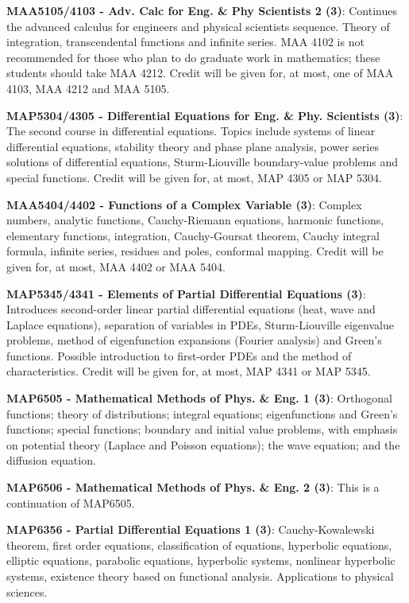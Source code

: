 \documentclass[11pt]{article}
\begin{document}
\textbf{MAA5105/4103 - Adv. Calc for Eng. \& Phy Scientists 2 (3)}: Continues the advanced calculus for engineers and physical scientists sequence. Theory of integration, transcendental functions and infinite series. MAA 4102 is not recommended for those who plan to do graduate work in mathematics; these students should take MAA 4212. Credit will be given for, at most, one of MAA 4103, MAA 4212 and MAA 5105.

\textbf{MAP5304/4305 - Differential Equations for Eng. \& Phy. Scientists (3)}: The second course in differential equations. Topics include systems of linear differential equations, stability theory and phase plane analysis, power series solutions of differential equations, Sturm-Liouville boundary-value problems and special functions. Credit will be given for, at most, MAP 4305 or MAP 5304.

\textbf{MAA5404/4402 - Functions of a Complex Variable (3)}: Complex numbers, analytic functions, Cauchy-Riemann equations, harmonic functions, elementary functions, integration, Cauchy-Goursat theorem, Cauchy integral formula, infinite series, residues and poles, conformal mapping. Credit will be given for, at most, MAA 4402 or MAA 5404.

\textbf{MAP5345/4341 - Elements of Partial Differential Equations (3)}: Introduces second-order linear partial differential equations (heat, wave and Laplace equations), separation of variables in PDEs, Sturm-Liouville eigenvalue problems, method of eigenfunction expansions (Fourier analysis) and Green's functions. Possible introduction to first-order PDEs and the method of characteristics. Credit will be given for, at most, MAP 4341 or MAP 5345.

\textbf{MAP6505 - Mathematical Methods of Phys. \& Eng. 1 (3)}: Orthogonal functions; theory of distributions; integral equations; eigenfunctions and Green's functions; special functions; boundary and initial value problems, with emphasis on potential theory (Laplace and Poisson equations); the wave equation; and the diffusion equation.

\textbf{MAP6506 - Mathematical Methods of Phys. \& Eng. 2 (3)}: This is a continuation of MAP6505.

\textbf{MAP6356 - Partial Differential Equations 1 (3)}: Cauchy-Kowalewski theorem, first order equations, classification of equations, hyperbolic equations, elliptic equations, parabolic equations, hyperbolic systems, nonlinear hyperbolic systems, existence theory based on functional analysis. Applications to physical sciences.
\end{document}
